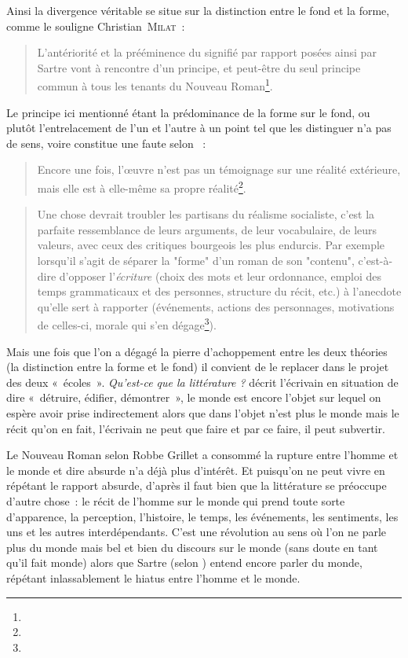 \documentclass[12pt, a4paper]{article}
\begin{document}
Ainsi la divergence véritable se situe sur la distinction entre le fond et la forme, comme le souligne Christian~\textsc{Milat}~:
\begin{quote}
    L'antériorité et la prééminence du signifié par rapport
posées ainsi par Sartre vont à rencontre d'un principe, et peut-être du seul
principe commun à tous les tenants du Nouveau Roman\footnote{}.
\end{quote}
Le principe ici mentionné étant la prédominance de la forme sur le fond, ou plutôt l'entrelacement de l'un et l'autre à un point tel que les distinguer n'a pas de sens, voire constitue une faute selon \robbe~:
\begin{quote}
    Encore une fois, l'œuvre n'est pas un témoignage sur une réalité extérieure, mais elle est à elle-même sa propre réalité\footnote{}.
\end{quote}
\begin{quote}
    Une chose devrait troubler les partisans du réalisme socialiste, c'est la parfaite ressemblance de leurs arguments, de leur vocabulaire, de leurs valeurs, avec ceux des critiques bourgeois les plus endurcis. Par exemple lorsqu'il s'agit de séparer la "forme" d'un roman de son "contenu", c'est-à-dire d'opposer l'\textit{écriture} (choix des mots et leur ordonnance, emploi des temps grammaticaux et des personnes, structure du récit, etc.) à l'anecdote qu'elle sert à rapporter (événements, actions des personnages, motivations de celles-ci, morale qui s'en dégage\footnote{}).
\end{quote}

Mais une fois que l'on a dégagé la pierre d'achoppement entre les deux théories (la distinction entre la forme et le fond) il convient de le replacer dans le projet des deux «~écoles~». \textit{Qu'est-ce que la littérature ?} décrit l'écrivain en situation de dire «~détruire, édifier, démontrer~», le monde est encore l'objet sur lequel on espère avoir prise indirectement alors que dans \punr{} l'objet n'est plus le monde mais le récit qu'on en fait, l'écrivain ne peut que faire et par ce faire, il peut subvertir. 

Le Nouveau Roman selon Robbe Grillet a consommé la rupture entre l'homme et le monde et dire absurde n'a déjà plus d'intérêt. Et puisqu'on ne peut vivre en répétant le rapport absurde, d'après \robbe{} il faut bien que la littérature se préoccupe d'autre chose~: le récit de l'homme sur le monde qui prend toute sorte d'apparence, la perception, l'histoire, le temps, les événements, les sentiments, les uns et les autres interdépendants. C'est une révolution au sens où l'on ne parle plus du monde mais bel et bien du discours sur le monde (sans doute en tant qu'il fait monde) alors que Sartre (selon \punr) entend encore parler du monde, répétant inlassablement le hiatus entre l'homme et le monde.
\end{document}

